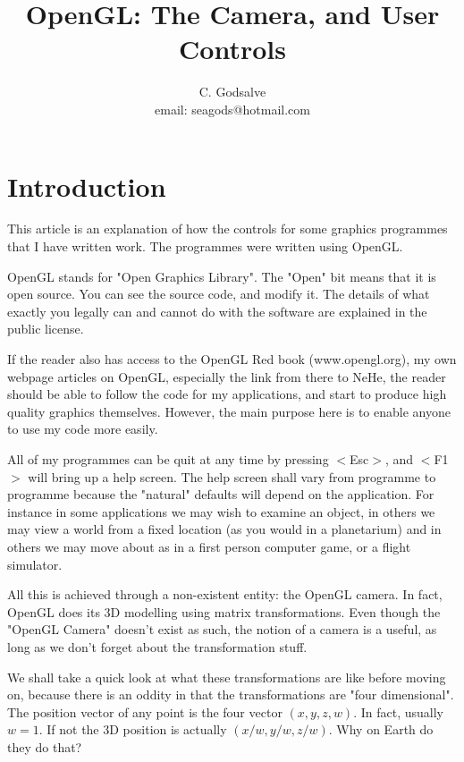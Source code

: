 \documentclass[12pt]{article}
\begin{document}

\thispagestyle{empty}


\title{OpenGL: The Camera,  and User Controls}

\author{C. Godsalve \\
   email: seagods@hotmail.com}

\maketitle

\tableofcontents


\section{Introduction}

This article is an explanation of how  the controls for
some graphics programmes
that I have written work. The programmes were written using OpenGL.


OpenGL stands for "Open Graphics Library".
The "Open" bit means that it is open source. You can see the
source code, and modify it. The details of what exactly you 
legally can and cannot do with the software are explained in
the public license.


If the reader also has access to the OpenGL Red book (www.opengl.org),
 my own webpage articles on OpenGL, especially the  link
from there to  NeHe, the reader should be able
 to follow the code for my applications, 
 and start to produce high quality graphics themselves.
 However, the main purpose here
is to enable anyone to use my code more easily.

All of my programmes can be quit at any time by pressing
 $<$Esc$>$,
 and $<$F1$>$ will bring up a help screen. The help screen
shall vary from programme to programme because the "natural" 
defaults will depend on the application. For instance
in some applications we may wish to examine an object, in
others we may view a world from a fixed location (as you
would in a planetarium) and in others we may move about
as in a first person computer game, or a flight simulator.

All this is achieved through a non-existent entity: the OpenGL
camera. In fact, OpenGL does its 3D modelling using matrix
transformations. Even though the "OpenGL Camera" doesn't exist
as such, the notion of a camera is a useful,
 as long as we don't forget about the transformation stuff.

We shall  take a quick look at what these transformations are
like before moving on, because there is an oddity in that
the transformations are "four dimensional". The position
vector of any point is the four vector $(x, y, z, w)$.
In fact, usually $w=1$. If not the 3D position is actually
 $(x/w, y/w, z/w)$. Why on Earth do they do that?
\end{document}
